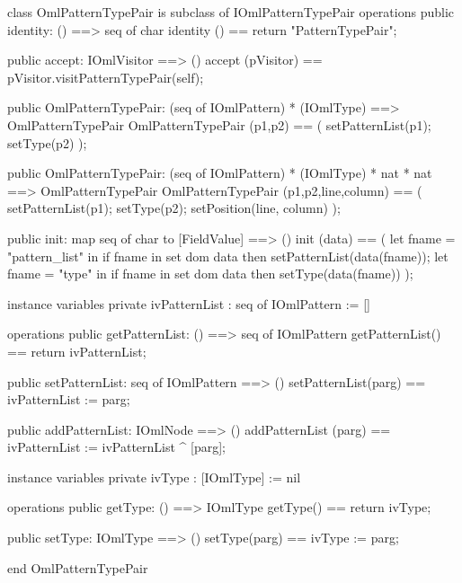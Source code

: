 \begin{vdm_al}
class OmlPatternTypePair is subclass of IOmlPatternTypePair
operations
  public identity: () ==> seq of char
  identity () == return "PatternTypePair";

  public accept: IOmlVisitor ==> ()
  accept (pVisitor) == pVisitor.visitPatternTypePair(self);

  public OmlPatternTypePair:
    (seq of IOmlPattern) *
    (IOmlType) ==> OmlPatternTypePair
  OmlPatternTypePair (p1,p2) == 
    ( setPatternList(p1);
      setType(p2) );

  public OmlPatternTypePair:
    (seq of IOmlPattern) *
    (IOmlType) *
    nat *
    nat ==> OmlPatternTypePair
  OmlPatternTypePair (p1,p2,line,column) == 
    ( setPatternList(p1);
      setType(p2);
      setPosition(line, column) );

  public init: map seq of char to [FieldValue] ==> ()
  init (data) ==
    ( let fname = "pattern_list" in
        if fname in set dom data
        then setPatternList(data(fname));
      let fname = "type" in
        if fname in set dom data
        then setType(data(fname)) );

instance variables
  private ivPatternList : seq of IOmlPattern := []

operations
  public getPatternList: () ==> seq of IOmlPattern
  getPatternList() == return ivPatternList;

  public setPatternList: seq of IOmlPattern ==> ()
  setPatternList(parg) == ivPatternList := parg;

  public addPatternList: IOmlNode ==> ()
  addPatternList (parg) == ivPatternList := ivPatternList ^ [parg];

instance variables
  private ivType : [IOmlType] := nil

operations
  public getType: () ==> IOmlType
  getType() == return ivType;

  public setType: IOmlType ==> ()
  setType(parg) == ivType := parg;

end OmlPatternTypePair
\end{vdm_al}

